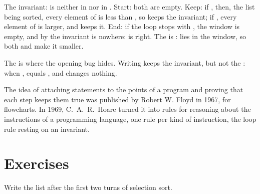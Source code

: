 The invariant:  is neither in  nor in . Start: both are empty. Keep: if
, then, the list being sorted, every element of  is less than , so
 keeps the invariant; if , every element of  is larger, and
 keeps it. End: if the loop stops with , the window is empty, and by the invariant
 is nowhere:  is right. The  is :  lies in the window, so both
 and  make it smaller.

The  is where the opening bug hides. Writing  keeps the invariant, but not the : when
,  equals , and  changes nothing.

\label{lst:g11:proving-algorithms-correct:bug}

\label{out:g11:proving-algorithms-correct:bug}

\begin{history}
The idea of attaching statements to the points of a program and proving that each step keeps them true was published
by Robert W. Floyd in 1967, for flowcharts. In 1969, C.~A.~R.~Hoare turned it into rules for reasoning about the
instructions of a programming language, one rule per kind of instruction, the loop rule resting on an invariant.
\end{history}

\section{Exercises}\label{sec:g11:proving-algorithms-correct:exercises}

\begin{exercise}[$\star$]\label{exo:g11:proving-algorithms-correct:1}
Write the list \code{[5, 2, 9, 1, 7]} after the first two turns of selection sort.
\end{exercise}

